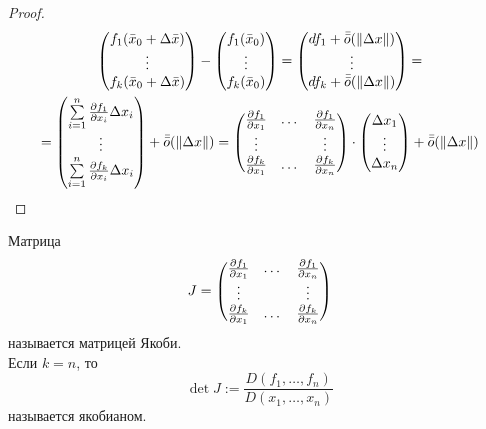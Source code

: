 \begin{proof}
    \begin{multline*}
        \begin{pmatrix}
            f_1(\bar{x}_0+\Delta \bar{x})\\
            \vdots\\
            f_k(\bar{x}_0+\Delta \bar{x})
        \end{pmatrix}
        -\begin{pmatrix}
            f_1(\bar{x}_0)\\
            \vdots\\
            f_k(\bar{x}_0)
        \end{pmatrix}
        =\begin{pmatrix}
            df_1+\bar{\bar{o}}{(\|\Delta x\|)}\\
            \vdots\\
            df_k+\bar{\bar{o}}{(\|\Delta x\|)}
        \end{pmatrix}=
        \\=\begin{pmatrix}
            \sum\limits_{i=1}^{n}\frac{\partial {f_1}}{\partial {x_i}}\Delta x_i\\
            \vdots\\
            \sum\limits_{i=1}^{n}\frac{\partial {f_k}}{\partial {x_i}}\Delta x_i
        \end{pmatrix}+\bar{\bar{o}}{(\|\Delta x\|)}=
        \begin{pmatrix}
            \frac{\partial {f_1}}{\partial {x_1}} & \dots & \frac{\partial {f_1}}{\partial {x_n}}\\
            \vdots & \null & \vdots\\
            \frac{\partial {f_k}}{\partial {x_1}} & \dots & \frac{\partial {f_k}}{\partial {x_n}}
        \end{pmatrix}
        \cdot 
        \begin{pmatrix}
            \Delta x_1\\
            \vdots\\
            \Delta x_n
        \end{pmatrix}    
        +\bar{\bar{o}}{(\|\Delta x\|)}    
    \end{multline*} 
\end{proof} 
    \begin{definition}
        Матрица
        \[J=\begin{pmatrix}
            \frac{\partial {f_1}}{\partial {x_1}} & \dots & \frac{\partial {f_1}}{\partial {x_n}}\\
            \vdots & \null & \vdots\\
            \frac{\partial {f_k}}{\partial {x_1}} & \dots & \frac{\partial {f_k}}{\partial {x_n}}
        \end{pmatrix}\]
        называется матрицей Якоби.\\
        Если $k=n$, то 
        \[\det{J}:=\frac{D(f_1,\dots,f_n)}{D(x_1,\dots,x_n)}\]
        называется якобианом.
    \end{definition} 
